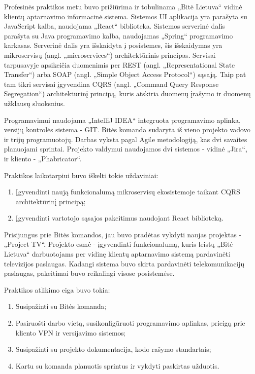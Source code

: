 \smallskip

Profesinės praktikos metu buvo prižiūrima ir tobulinama „Bitė Lietuva“ vidinė klientų aptarnavimo informacinė sistema. Sistemos UI aplikacija yra parašyta su JavaScript kalba,
naudojama „React“ biblioteka. Sistemos serverinė dalis parašyta su Java programavimo kalba, naudojamas „Spring“ programavimo karkasas. Serverinė dalis yra išskaidyta į
posistemes, šis išskaidymas yra mikroservisų (angl. „microservices“) architektūrinis principas. Servisai tarpusavyje apsikeičia duomenimis per
REST (angl. „Representational State Transfer“) arba SOAP (angl. „Simple Object Access Protocol“) sąsają. Taip pat tam tikri servisai įgyvendina
CQRS (angl. „Command Query Response Segregation“) architektūrinį principą, kuris atskiria duomenų įrašymo ir duomenų užklausų sluoksnius.

Programavimui naudojama „IntelliJ IDEA“ integruota programavimo aplinka, versijų kontrolės sistema - GIT. Bitės komanda sudaryta iš vieno projekto vadovo ir trijų programuotojų.
Darbas vyksta pagal Agile metodologiją, kas dvi savaites planuojami sprintai. Projekto valdymui naudojamos dvi sistemos - vidinė „Jira“, ir kliento - „Phabricator“.

\smallskip
Praktikos laikotarpiui buvo iškelti tokie uždaviniai:
\begin{enumerate}
    \item Įgyvendinti naują funkcionalumą mikroservisų ekosistemoje taikant CQRS architektūrinį principą;
    \item Įgyvendinti vartotojo sąsajos pakeitimus naudojant React biblioteką.
\end{enumerate}

\smallskip
Prisijungus prie Bitės komandos, jau buvo pradėtas vykdyti naujas projektas - „Project TV“. Projekto esmė - įgyvendinti funkcionalumą, kuris leistų „Bitė Lietuva“ darbuotojams
per vidinę klientų aptarnavimo sistemą pardavinėti televizijos paslaugas. Kadangi sistema buvo skirta pardavinėti telekomunikacijų paslaugas,
pakeitimai buvo reikalingi visose posistemėse.

\smallskip
Praktikos atlikimo eiga buvo tokia:
\begin{enumerate}
    \item Susipažinti su Bitės komanda;
    \item Pasiruošti darbo vietą, susikonfigūruoti programavimo aplinkas, prieigą prie kliento VPN ir versijavimo sistemos;
    \item Susipažinti su projekto dokumentacija, kodo rašymo standartais;
    \item Kartu su komanda planuotis sprintus ir vykdyti paskirtas užduotis.
\end{enumerate}

